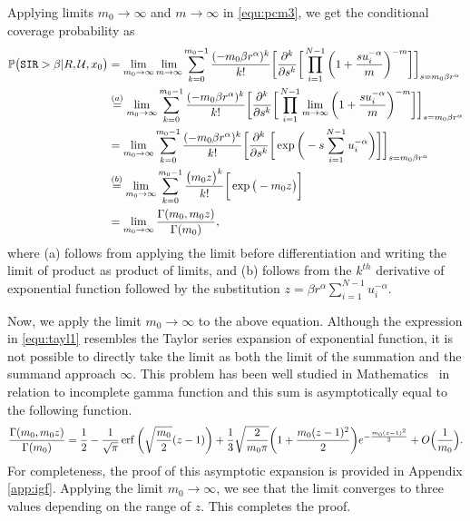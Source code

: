 \documentclass[journal,draftclsnofoot,onecolumn,12pt]{IEEEtran}
\begin{document}
\begin{IEEEproof}
Applying limits $m_0 \to \infty$ and $m \to \infty$ in \eqref{equ:pcm3}, we get the conditional coverage probability as 
\begin{align}\notag
\mathbb{P}\big( \mathtt{SIR} > \beta | R,{\mathcal{U}}, x_0\big) &= \lim_{m_0 \to \infty} \lim_{m \to \infty} \sum_{k=0}^{m_0-1} \frac{(-m_0 \beta r^{\alpha})^k}{k!} \bigg[ \frac{\partial^k}{\partial s^k} \bigg[ \prod_{i=1}^{N-1} \bigg(1 + \frac{s u_i^{-\alpha}}{m} \bigg)^{-m} \bigg] \bigg]_{s=m_0 \beta r^{\alpha}} \\\notag
&\stackrel{(a)}{=} \lim_{m_0 \to \infty}  \sum_{k=0}^{m_0-1} \frac{(-m_0 \beta r^{\alpha})^k}{k!} \bigg[ \frac{\partial^k}{\partial s^k} \bigg[ \prod_{i=1}^{N-1} \lim_{m \to \infty} \bigg(1 + \frac{s u_i^{-\alpha}}{m} \bigg)^{-m} \bigg] \bigg]_{s=m_0 \beta r^{\alpha}} \\\notag
&= \lim_{m_0 \to \infty}  \sum_{k=0}^{m_0-1} \frac{(-m_0 \beta r^{\alpha})^k}{k!} \bigg[ \frac{\partial^k}{\partial s^k} \bigg[ \exp\bigg(-s\sum_{i=1}^{N-1}u_i^{-\alpha}\bigg) \bigg] \bigg]_{s=m_0 \beta r^{\alpha}} \\ \label{equ:tayl1}
&\stackrel{(b)}{=} \lim_{m_0 \to \infty}  \sum_{k=0}^{m_0-1} \frac{\big(m_0 z \big)^k}{k!} \bigg[  \exp\big(-m_0 z\big) \bigg] \\\notag
&= \lim_{m_0 \to \infty} \frac{\Gamma(m_0, m_0 z)}{\Gamma(m_0)} ,
\end{align}
where (a) follows from applying the limit before differentiation and writing the limit of product as product of limits, and (b) follows from the $k^{th}$ derivative of exponential function followed by the substitution $z = \beta r^{\alpha} \sum_{i=1}^{N-1} u_i^{-\alpha}$.

Now, we apply the limit $m_0 \to \infty$ to the above equation. Although the expression in \eqref{equ:tayl1} resembles the Taylor series expansion of exponential function, it is not possible to directly take the limit as both the limit of the summation and the summand approach $\infty$. This problem has been well studied in Mathematics~\cite{abe,tricomi,temme,walter} in relation to incomplete gamma function and this sum is asymptotically equal to the following function.
\begin{align}
\frac{\Gamma(m_0, m_0 z)}{\Gamma(m_0)} = \frac{1}{2} - \frac{1}{\sqrt{\pi}} \operatorname{erf}\bigg(\sqrt{\frac{m_0}{2}}(z-1)\bigg) + \frac{1}{3}\sqrt{\frac{2}{m_0 \pi}}\bigg(1+\frac{m_0(z-1)^2}{2}\bigg) e^{-\frac{m_0(z-1)^2}{2}} + O\Big(\frac{1}{m_0}\Big).
\end{align}
For completeness, the proof of this asymptotic expansion is provided in Appendix \ref{app:igf}. 
Applying the limit $m_0 \to \infty$, we see that the limit converges to three values depending on the range of $z$. This completes the proof.
\end{IEEEproof}
\end{document}
